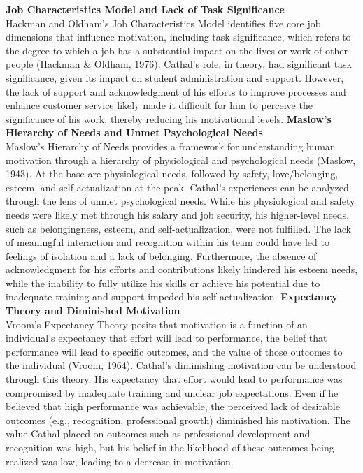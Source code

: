 \documentclass[12pt]{article}
\begin{document}
\begin{flushleft}
\bigbreak \noindent 
\textbf{Job Characteristics Model and Lack of Task Significance} \\
Hackman and Oldham's Job Characteristics Model identifies five core job dimensions that influence motivation, including task significance, which refers to the degree to which a job has a substantial impact on the lives or work of other people (Hackman & Oldham, 1976). Cathal's role, in theory, had significant task significance, given its impact on student administration and support. However, the lack of support and acknowledgment of his efforts to improve processes and enhance customer service likely made it difficult for him to perceive the significance of his work, thereby reducing his motivational levels.
\bigbreak \noindent 
\textbf{Maslow’s Hierarchy of Needs and Unmet Psychological Needs} \\
Maslow's Hierarchy of Needs provides a framework for understanding human motivation through a hierarchy of physiological and psychological needs (Maslow, 1943). At the base are physiological needs, followed by safety, love/belonging, esteem, and self-actualization at the peak. Cathal's experiences can be analyzed through the lens of unmet psychological needs. While his physiological and safety needs were likely met through his salary and job security, his higher-level needs, such as belongingness, esteem, and self-actualization, were not fulfilled. The lack of meaningful interaction and recognition within his team could have led to feelings of isolation and a lack of belonging. Furthermore, the absence of acknowledgment for his efforts and contributions likely hindered his esteem needs, while the inability to fully utilize his skills or achieve his potential due to inadequate training and support impeded his self-actualization.
\bigbreak \noindent 
\textbf{Expectancy Theory and Diminished Motivation} \\
Vroom's Expectancy Theory posits that motivation is a function of an individual's expectancy that effort will lead to performance, the belief that performance will lead to specific outcomes, and the value of those outcomes to the individual (Vroom, 1964). Cathal's diminishing motivation can be understood through this theory. His expectancy that effort would lead to performance was compromised by inadequate training and unclear job expectations. Even if he believed that high performance was achievable, the perceived lack of desirable outcomes (e.g., recognition, professional growth) diminished his motivation. The value Cathal placed on outcomes such as professional development and recognition was high, but his belief in the likelihood of these outcomes being realized was low, leading to a decrease in motivation.

\end{flushleft}
\end{document}
